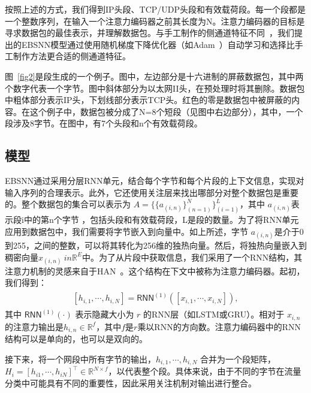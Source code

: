 \documentclass[degree=master,cjk-font=noto]{thuthesis}
\begin{document}
按照上述的方式，我们得到IP头段、TCP/UDP头段和有效载荷段。每一个段都是一个整数序列，在输入一个注意力编码器之前其长度为N。注意力编码器的目标是寻求数据包的最佳表示，并理解数据包。与手工制作的侧通道特征不同~\cite{moore2005discriminators}，我们提出的EBSNN模型通过使用随机梯度下降优化器（如Adam~\cite{Adam}）自动学习和选择比手工制作方法更合适的侧通道特征。

图~\ref{fig2}是段生成的一个例子。图中，左边部分是十六进制的屏蔽数据包，其中两个数字代表一个字节。图中斜体部分为以太网II头，在预处理时将其删除。数据包中粗体部分表示IP头，下划线部分表示TCP头。红色的零是数据包中被屏蔽的内容。在这个例子中，数据包被分成了N=8个短段（见图中右边部分），其中，一个段涉及8字节。在图中，有7个头段和n个有效载荷段。

\subsection{模型}
\label{model}

EBSNN通过采用分层RNN单元，结合每个字节和每个片段的上下文信息，实现对输入序列的合理表示。此外，它还使用关注层来找出哪部分对整个数据包是重要的。整个数据包的集合可以表示为 $A=\{\{a_{(i,n)} \}_{(n=1)}^N \}_{(i=1)}^L$，其中 $a_{(i,n)}$表示段i中的第n个字节 ，包括头段和有效载荷段，L是段的数量。为了将RNN单元应用到数据包中，我们需要将字节嵌入到向量中。如上所述，字节 $a_{(i,n)}$是介于0到255，之间的整数，可以将其转化为256维的独热向量。然后，将独热向量嵌入到稠密向量$x_{(i,n)}\ in \mathbb{R}^E$中。为了从片段中获取信息，我们采用了一个RNN结构，其注意力机制的灵感来自于HAN~\cite{b29}。这个结构在下文中被称为注意力编码器。起初，我们得到：
\begin{align}
	\begin{split}
		[h_{i,1}, \cdots, h_{i,N}] = \textsf{RNN}^{(1)}([x_{i,1}, \cdots, x_{i,N}]),
	\end{split}
\end{align}
其中 $\textsf{RNN}^{(1)}(\cdot)$ 表示隐藏大小为 $r$ 的RNN层（如LSTM或GRU）。相对于 $x_{i,n}$ 的注意力输出是$h_{i,n} \in \mathbb{R}^{f}$，其中$f$是$r$乘以RNN的方向数。注意力编码器中的RNN结构可以是单向的，也可以是双向的。

接下来，将一个网段中所有字节的输出，$h_{i,1}, \cdots, h_{i,N}$ 合并为一个段矩阵，$H_i  = [h_{i1}, \cdots, h_{iN}]^\top \in \mathbb{R}^{N \times f}$，以代表整个段。具体来说，由于不同的字节在流量分类中可能具有不同的重要性，因此采用关注机制对输出进行整合。
\end{document}
